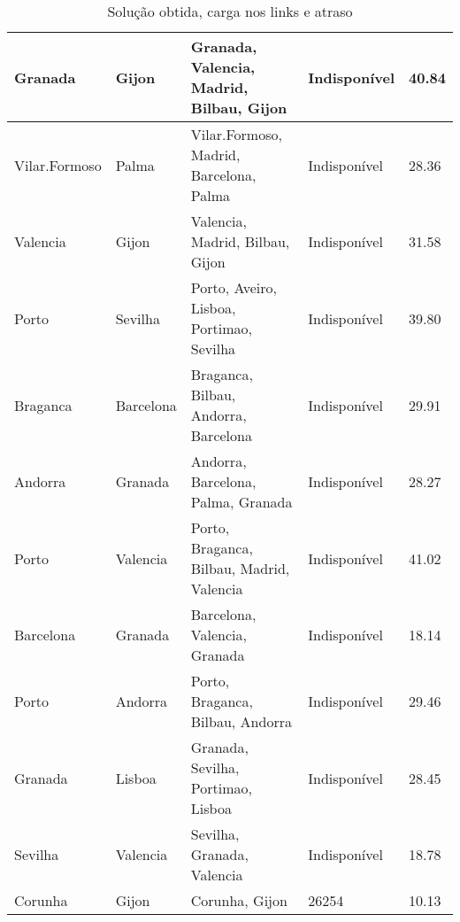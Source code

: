 \begin{table}[!htb]
{\begin{tabular}{|l|l|l|l|l|}
Granada & Gijon & Granada, Valencia, Madrid, Bilbau, Gijon & Indisponível & 40.84 \\ \hline
Vilar.Formoso & Palma & Vilar.Formoso, Madrid, Barcelona, Palma & Indisponível & 28.36 \\ \hline
Valencia & Gijon & Valencia, Madrid, Bilbau, Gijon & Indisponível & 31.58 \\ \hline
Porto & Sevilha & Porto, Aveiro, Lisboa, Portimao, Sevilha & Indisponível & 39.80 \\ \hline
Braganca & Barcelona & Braganca, Bilbau, Andorra, Barcelona & Indisponível & 29.91 \\ \hline
Andorra & Granada & Andorra, Barcelona, Palma, Granada & Indisponível & 28.27 \\ \hline
Porto & Valencia & Porto, Braganca, Bilbau, Madrid, Valencia & Indisponível & 41.02 \\ \hline
Barcelona & Granada & Barcelona, Valencia, Granada & Indisponível & 18.14 \\ \hline
Porto & Andorra & Porto, Braganca, Bilbau, Andorra & Indisponível & 29.46 \\ \hline
Granada & Lisboa & Granada, Sevilha, Portimao, Lisboa & Indisponível & 28.45 \\ \hline
Sevilha & Valencia & Sevilha, Granada, Valencia & Indisponível & 18.78 \\ \hline
Corunha & Gijon & Corunha, Gijon & 26254 & 10.13 \\ \hline
\end{tabular}}
\caption[]{Solução obtida, carga nos links e atraso}
\end{table}

\begin{table}[!htb]
        \centering
\caption[]{Solução obtida, carga nos links e atraso}
\end{table}

